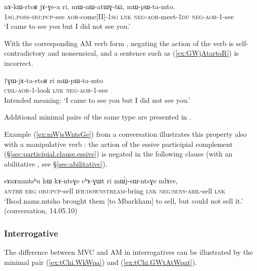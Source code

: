 \begin{exe}
\ex \label{ex:nAkWrtoR}
\gll nɤ-kɯ-rtoʁ jɤ-ɣe-a ri, mɯ-nɯ-atɯɣ-tɕi, mɯ-pɯ-ta-mto. \\
\textsc{1sg}.\textsc{poss}-\textsc{sbj}:\textsc{pcp}-see \textsc{aor}-come[II]-\textsc{1sg} \textsc{lnk} \textsc{neg}-\textsc{aor}-meet-\textsc{1du} \textsc{neg}-\textsc{aor}-1-see \\
\glt `I came to see you but I did not see you.' 
\end{exe}

With the corresponding AM verb form , negating the action of the verb is self-contradictory and nonsensical, and a sentence such as (\ref{ex:GWjAtartoR}) is incorrect.

\begin{exe}
\ex \label{ex:GWjAtartoR}
\gll $\dagger$ɣɯ-jɤ-ta-rtoʁ ri mɯ-pɯ-ta-mto \\
\textsc{cisl}-\textsc{aor}-1-look \textsc{lnk} \textsc{neg}-\textsc{aor}-1-see \\
\glt Intended meaning: `I came to see you but I did not see you.' 
\end{exe}

Additional minimal pairs of the same type are presented in \citet[202--203]{jacques13harmonization}.

Example (\ref{ex:mWjsWntsGe}) from a conversation illustrates this property also with a manipulative verb : the action of the essive participial complement  (§\ref{sec:participial.clause.essive}) is negated in the following clause (with an abilitative , see §\ref{sec:abilitative}).

 \begin{exe}
\ex \label{ex:mWjsWntsGe}
 \gll   sɤnɤmmtsʰu kɯ kɤ-ntsɣe cʰɤ-ɣɯt ri mɯ́j-sɯ-ntsɣe ndɤre, \\
  \textsc{anthr} \textsc{erg} \textsc{obj}:\textsc{pcp}-sell \textsc{ifr}:\textsc{downstream}-bring \textsc{lnk} \textsc{neg}:\textsc{sens}-\textsc{abil}-sell \textsc{lnk} \\
\glt `Bsod.nams.mtsho brought them [to Mbarkham] to sell, but could not sell it.' (conversation, 14.05.10)
 \end{exe}

\subsubsection{Interrogative} \label{sec:am.interrogative}
The difference between MVC and AM in interrogatives can be illustrated by the minimal pair (\ref{ex:tChi.WkWpa}) and (\ref{ex:tChi.GWtAtWpat}). 

